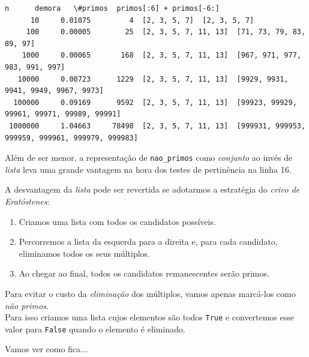 \documentclass[11pt,a4paper]{article}
\providecommand{\tightlist}{%
      \setlength{\itemsep}{0pt}\setlength{\parskip}{0pt}}
\begin{document}
    \begin{Verbatim}[commandchars=\\\{\}]
       n      demora   \#primos  primos[:6] + primos[-6:]
      10     0.01075         4  [2, 3, 5, 7]  [2, 3, 5, 7]
     100     0.00005        25  [2, 3, 5, 7, 11, 13]  [71, 73, 79, 83, 89, 97]
    1000     0.00065       168  [2, 3, 5, 7, 11, 13]  [967, 971, 977, 983, 991, 997]
   10000     0.00723      1229  [2, 3, 5, 7, 11, 13]  [9929, 9931, 9941, 9949, 9967, 9973]
  100000     0.09169      9592  [2, 3, 5, 7, 11, 13]  [99923, 99929, 99961, 99971, 99989, 99991]
 1000000     1.04663     78498  [2, 3, 5, 7, 11, 13]  [999931, 999953, 999959, 999961, 999979, 999983]

    \end{Verbatim}

    Além de ser menor, a representação de \texttt{nao\_primos} como
\emph{conjunto} ao invés de \emph{lista} leva uma grande vantagem na
hora dos testes de pertinência na linha 16.

    A desvantagem da \emph{lista} pode ser revertida se adotarmos a
estratégia do \emph{crivo de Eratóstenes}:

\begin{enumerate}
\def\labelenumi{\arabic{enumi}.}
\tightlist
\item
  Criamos uma lista com todos os candidatos possíveis.
\item
  Percorremos a lista da esquerda para a direita e, para cada candidato,
  eliminamos todos os seus múltiplos.
\item
  Ao chegar ao final, todos os candidatos remanescentes serão primos.
\end{enumerate}

    Para evitar o custo da \emph{eliminação} dos múltiplos, vamos apenas
marcá-los como \emph{não primos}.\\
Para isso criamos uma lista cujos elementos são todos \texttt{True} e
convertemos esse valor para \texttt{False} quando o elemento é
eliminado.

Vamos ver como fica...

\pagebreak
\end{document}

